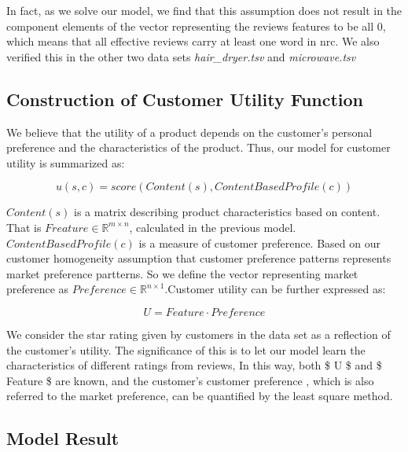\documentclass[12pt,a4paper,]{article}
\begin{document}
In fact, as we solve our model, we find that this assumption does not
result in the component elements of the vector representing the reviews
features to be all 0, which means that all effective reviews carry at
least one word in nrc. We also verified this in the other two data sets
\emph{hair\_dryer.tsv} and \emph{microwave.tsv}

\hypertarget{construction-of-customer-utility-function}{%
\subsection{Construction of Customer Utility
Function}\label{construction-of-customer-utility-function}}

We believe that the utility of a product depends on the customer's
personal preference and the characteristics of the product. Thus, our
model for customer utility is summarized as:

\begin{equation}
u(s, c)= score (Content (s), ContentBasedProfile(c))
\end{equation}

\(Content(s)\) is a matrix describing product characteristics based on
content. That is \(Freature\in\mathbb{R}^{m\times n}\), calculated in
the previous model. \(ContentBasedProfile(c)\) is a measure of customer
preference. Based on our customer homogeneity assumption that customer
preference patterns represents market preference partterns. So we define
the vector representing market preference as
\(Preference\in\mathbb{R}^{n\times 1}\).Customer utility can be further
expressed as:

\begin{equation}
U= Feature \cdot Preference 
\end{equation}

We consider the star rating given by customers in the data set as a
reflection of the customer's utility. The significance of this is to let
our model learn the characteristics of different ratings from reviews,
In this way, both \$ U \$ and \$ Feature \$ are known, and the
customer's customer preference , which is also referred to the market
preference, can be quantified by the least square method.

\hypertarget{model-result-1}{%
\subsection{Model Result}\label{model-result-1}}
\end{document}
